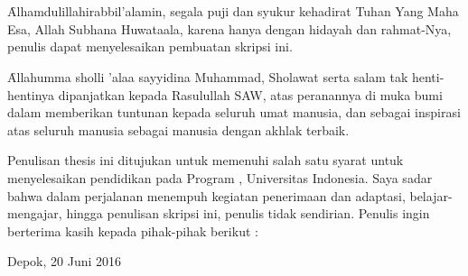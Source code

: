 \chapter*{\kataPengantar}
\f{Alhamdulillahirabbil'alamin}, segala puji dan syukur kehadirat Tuhan Yang Maha Esa, Allah Subhana Huwataala, karena hanya dengan hidayah dan rahmat-Nya, penulis dapat menyelesaikan pembuatan skripsi ini.

\f{Allahumma sholli 'alaa sayyidina Muhammad}, Sholawat serta salam tak henti-hentinya dipanjatkan kepada Rasulullah SAW, atas peranannya di muka bumi dalam memberikan tuntunan kepada seluruh umat manusia, dan sebagai inspirasi atas seluruh manusia sebagai manusia dengan akhlak terbaik.

Penulisan thesis ini ditujukan untuk memenuhi salah satu syarat untuk menyelesaikan pendidikan pada Program \gelar, Universitas Indonesia. Saya sadar bahwa dalam perjalanan menempuh kegiatan penerimaan dan adaptasi, belajar-mengajar, hingga penulisan skripsi ini, penulis tidak sendirian. Penulis ingin berterima kasih kepada pihak-pihak berikut : 

\vspace*{0.1cm}
\begin{flushright}
	Depok, 20 Juni 2016\\[0.1cm]
	\vspace*{1cm}
	\penulis
\end{flushright}